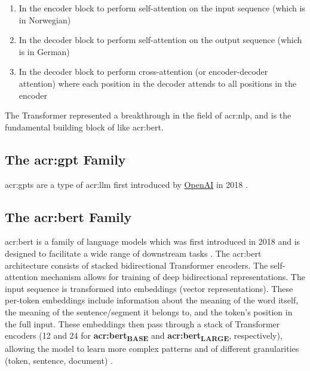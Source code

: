 \begin{enumerate}
    \item In the encoder block to perform self-attention on the input sequence (which is in Norwegian)
    \item In the decoder block to perform self-attention on the output sequence (which is in German)
    \item In the decoder block to perform cross-attention (or encoder-decoder attention) where each position in the decoder attends to all positions in the encoder
\end{enumerate}

The Transformer represented a breakthrough in the field of \gls{acr:nlp}, and is the fundamental building block of  like \acrshort{acr:bert}.


\subsection[The GPT Family]{The \acrshort{acr:gpt} Family}\label{subsec:gpt}

\glspl{acr:gpt} are a type of \gls{acr:llm} first introduced by \hyperref[subsec:openai]{OpenAI} in 2018 \citep{radfordImprovingLanguageUnderstanding2018}.

\subsection[The BERT Family]{The \acrshort{acr:bert} Family}\label{subsec:bert}

\gls{acr:bert} is a family of language models which was first introduced in 2018 and is designed to facilitate a wide range of downstream tasks \citep[5]{devlinBERTPretrainingDeep2019}. The \acrshort{acr:bert} architecture consists of stacked bidirectional Transformer encoders. The self-attention mechanism allows for training of deep bidirectional representations. The input sequence is transformed into embeddings (vector representations). These per-token embeddings include information about the meaning of the word itself, the meaning of the sentence/segment it belongs to, and the token's position in the full input. These embeddings then pass through a stack of Transformer encoders (12 and 24 for \textbf{\acrshort{acr:bert}\textsubscript{BASE}} and \textbf{\acrshort{acr:bert}\textsubscript{LARGE}}, respectively), allowing the model to learn more complex patterns and of different granularities (token, sentence, document) \citep[5]{devlinBERTPretrainingDeep2019}.

